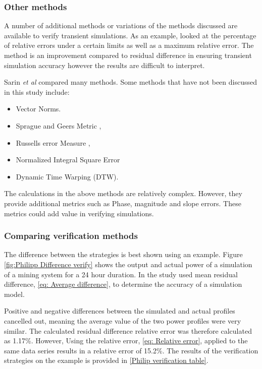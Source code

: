  		\subsubsection{Other methods}
 		A number of additional methods or variations of the methods discussed are available to verify transient simulations. As an example, \cite{arndt2007integrated} looked at the percentage of relative errors under a certain limits as well as a maximum relative error. The method is an improvement compared to residual  difference in ensuring transient simulation accuracy however the results are difficult to interpret.
 		\par
 		Sarin \textit{et al} \cite{sarin2010comparing} compared many methods. Some methods that have not been discussed in this study include:
 		\begin{itemize}
 			\item Vector Norms.
 			\item Sprague and Geers Metric \cite{Geers1984Objective},\cite{Sprague2004Spectral}
 			\item Russells error Measure \cite{Russell1},\cite{Russell2}
 			\item Normalized Integral Square Error
 			\item Dynamic Time Warping (DTW).
 		\end{itemize}
 		The calculations in the above methods are relatively complex. However, they provide additional metrics such as Phase, magnitude and slope errors. These metrics could add value in verifying simulations.
 		\subsubsection{Comparing verification methods}
 		The difference between the strategies is best shown using an example. Figure \cref{fig:Philipp Difference verify} shows the output and actual power of a simulation of a mining system for a 24 hour duration. In the study \cite{Mare2016PhD} used mean residual difference, \cref{eq: Average difference}, to determine the accuracy of a simulation model.
 		\par 
 		 Positive and negative differences between the simulated and actual profiles cancelled out, meaning the average value of the two power profiles were very similar. The calculated residual difference relative error was therefore calculated as 1.17\%. However, Using the relative error, \cref{eq: Relative error}, applied to the same data series results in a relative error of 15.2\%. The results of the verification strategies on the example is provided in \cref{Philip verification table}. 
 		

